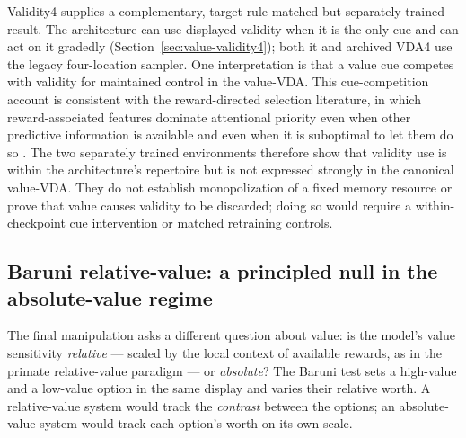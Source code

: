 Validity4 supplies a complementary, target-rule-matched but separately trained result. The architecture
can use displayed validity when it is the only cue and can act on it gradedly
(Section~\ref{sec:value-validity4}); both it and archived VDA4 use the legacy
four-location sampler. One interpretation is that a value cue competes
with validity for maintained control in the value-VDA. This cue-competition account is
consistent with the reward-directed
selection literature, in which reward-associated features dominate attentional
priority even when other predictive information is available and even when it is
suboptimal to let them do so \cite{failing_theeuwes2018_selection_history,
hickey2010_reward_salience_acc, wang_theeuwes2018_statistical_learning_distractor_suppression}.
The two separately trained environments therefore show that validity use is within the
architecture's repertoire but is not expressed strongly in the canonical value-VDA.
They do not establish monopolization of a fixed memory resource or prove that value
causes validity to be discarded; doing so would require a within-checkpoint cue
intervention or matched retraining controls.

\subsection{Baruni relative-value: a principled null in the absolute-value regime}
\label{sec:value-baruni}

The final manipulation asks a different question about value: is the model's value
sensitivity \emph{relative} --- scaled by the local context of available rewards,
as in the primate relative-value paradigm --- or \emph{absolute}? The Baruni test
sets a high-value and a low-value option in the same display and varies their
relative worth. A relative-value system would track the \emph{contrast} between the
options; an absolute-value system would track each option's worth on its own scale.

